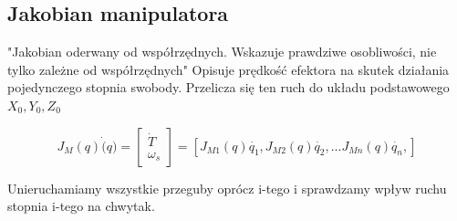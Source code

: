 \documentclass{article}
\begin{document}
\subsection{Jakobian manipulatora}

"Jakobian oderwany od współrzędnych. Wskazuje prawdziwe osobliwości, nie tylko zależne od współrzędnych"
Opisuje prędkość efektora na skutek działania pojedynczego stopnia swobody.
Przelicza się ten ruch do układu podstawowego $X_0, Y_0, Z_0$

\Large
$$  J_M (q) \dot(q) =
    \begin{bmatrix}
        \dot{T} \\
        \omega_s
    \end{bmatrix}
    = \left[
        J_{M1}(q) \dot{q_1}, J_{M2}(q) \dot{q_2}, ... J_{Mn}(q) \dot{q_n},
    \right]
$$
\normalsize

Unieruchamiamy wszystkie przeguby oprócz i-tego i sprawdzamy wpływ ruchu stopnia i-tego na chwytak.
\end{document}
